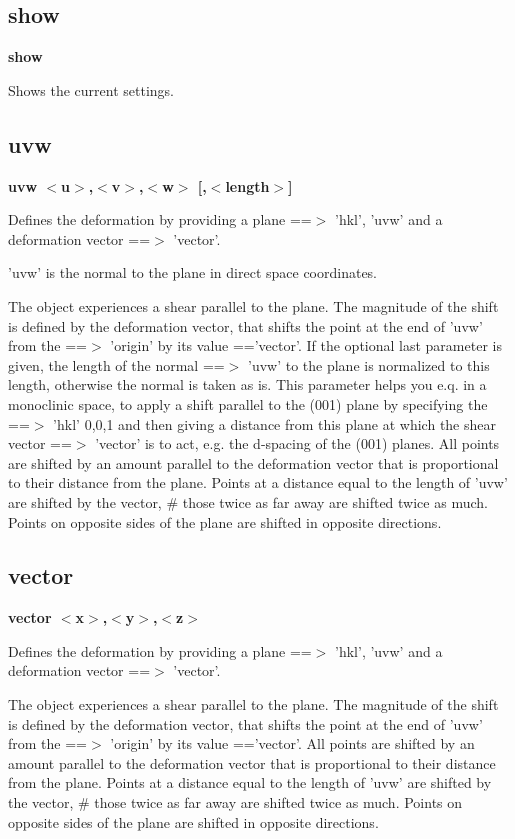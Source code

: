\subsection*{show}
{\bf show \par }
\par
\vspace{3pt}
Shows the current settings. 
\subsection*{uvw}
{\bf uvw $ <$u$> $,$ <$v$> $,$ <$w$> $ [,$ <$length$> $] \par }
\par
\vspace{3pt}
Defines the deformation by providing a plane ==$> $ 'hkl', 'uvw' and 
a deformation vector ==$> $ 'vector'. 
\par
'uvw' is the normal to the plane in direct space coordinates. 
\par
The object experiences a shear parallel to the plane. The 
magnitude of the shift is defined by the deformation vector, 
that shifts the point at the end of 'uvw' from the ==$> $ 'origin' 
by its value =='vector'. 
If the optional last parameter is given, the length of the normal 
==$> $ 'uvw' to the plane is normalized to this length, otherwise the 
normal is taken as is. This parameter helps you e.q. in a monoclinic 
space, to apply a shift parallel to the (001) plane by specifying 
the ==$> $ 'hkl' 0,0,1 and then giving a distance from this plane at 
which the shear vector ==$> $ 'vector' is to act, e.g. the d-spacing 
of the (001) planes. 
All points are shifted by an amount parallel to the deformation vector 
that is proportional to their distance from the plane. Points at 
a distance equal to the length of 'uvw' are shifted by the vector, \# 
those twice as far away are shifted twice as much. Points on 
opposite sides of the plane are shifted in opposite directions. 
\subsection*{vector}
{\bf vector $ <$x$> $,$ <$y$> $,$ <$z$> $ \par }
\par
\vspace{3pt}
Defines the deformation by providing a plane ==$> $ 'hkl', 'uvw' and 
a deformation vector ==$> $ 'vector'. 
\par
The object experiences a shear parallel to the plane. The 
magnitude of the shift is defined by the deformation vector, 
that shifts the point at the end of 'uvw' from the ==$> $ 'origin' 
by its value =='vector'. 
All points are shifted by an amount parallel to the deformation vector 
that is proportional to their distance from the plane. Points at 
a distance equal to the length of 'uvw' are shifted by the vector, \# 
those twice as far away are shifted twice as much. Points on 
opposite sides of the plane are shifted in opposite directions. 
